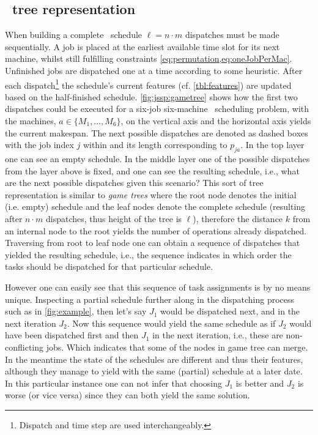 \subsection{\JSP\ tree representation}\label{sec:gen:gametree}
When building a complete \JSP\ schedule $\ell=n\cdot m$ dispatches must be made sequentially. 
A job is placed at the earliest available time slot for its next machine, whilst still fulfilling constraints \cref{eq:permutation,eq:oneJobPerMac}.
Unfinished jobs are dispatched one at a time according to some heuristic. After each dispatch\footnote{Dispatch and time step are used interchangeably.} the schedule's current features (cf. \cref{tbl:features}) are updated based on the half-finished schedule. \cref{fig:jssp:gametree} shows how the first two dispatches could be executed for a six-job six-machine \jsp\ scheduling problem, with the machines, $a\in\{M_1,...,M_6\}$, on the vertical axis and the horizontal axis yields the current makespan. The next possible dispatches are denoted as dashed boxes with the job index $j$ within and its length corresponding to $p_{ja}$.
In the top layer one can see an empty schedule.
In the middle layer one of the possible dispatches from the layer above is fixed, and one can see the resulting schedule, i.e., what are the next possible dispatches given this scenario? This sort of tree representation is similar to \emph{game trees} \citep[cf.][]{Rosen03} where the root node denotes the initial (i.e. empty) schedule and the leaf nodes denote the complete schedule (resulting after $n\cdot m$ dispatches, thus height of the tree is $\ell$), therefore the distance $k$ from an internal node to the root yields the number of operations already dispatched. Traversing from root to leaf node one can obtain a sequence of dispatches that yielded the resulting schedule, i.e., the sequence indicates in which order the tasks should be dispatched for that particular schedule. 

However one can easily see that this sequence of task assignments is by no means unique. Inspecting a partial schedule further along in the dispatching process such as in \cref{fig:example}, then let's say $J_1$ would be dispatched next, and in the next iteration $J_2$. Now this sequence would yield the same schedule as if $J_2$ would have been dispatched first and then $J_1$ in the next iteration, i.e., these are non-conflicting jobs. Which indicates that some of the nodes in game tree can merge. In the meantime the state of the schedules are different and thus their features, although they manage to yield with the same (partial) schedule at a later date.  %
In this particular instance one can not infer that choosing $J_1$ is better and $J_2$ is worse (or vice versa) since they can both yield the same solution.

